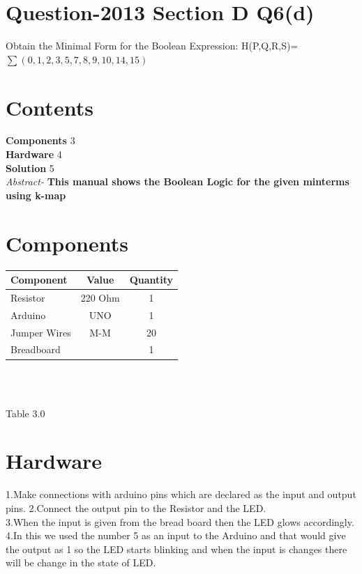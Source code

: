 \documentclass[10pt]{report}
\begin{document}
\begin{multicols}{2} 
\section{Question-2013 Section D Q6(d)}
Obtain the Minimal Form for the Boolean Expression:
H(P,Q,R,S)=$\sum(0,1,2,3,5,7,8,9,10,14,15)$
\section{Contents}
\raggedright
\textbf{Components}
\hspace{10em} 3
\\\textbf{Hardware}
\hspace{11.3em}   4
\\\textbf{Solution}
\hspace{12.1em}   5\\
\textit{Abstract-}
\textbf{This manual shows the Boolean Logic for the given minterms using k-map}
\section{Components}
\centering
\begin{tabular}{|l|c|c|}
\hline
Component & Value & Quantity\\
\hline
Resistor & 220 Ohm & 1\\
\hline
Arduino & UNO & 1\\
\hline
Jumper Wires & M-M & 20\\
\hline
Breadboard & & 1\\
\hline
\end{tabular}\\
\
\centerline{Table 3.0}
\section{Hardware}
\raggedright
1.Make connections with arduino pins which are declared as the input and output pins.
2.Connect the output pin to the Resistor and the LED.\\
3.When the input is given from the bread board then the LED glows accordingly.\\
\raggedleft 4.In this we used the number 5 as an input to the Arduino and that would give the output as 1 so the LED starts blinking and when the input is changes there will be change in the state of LED.
\raggedright 

\end{multicols}
\end{document}

